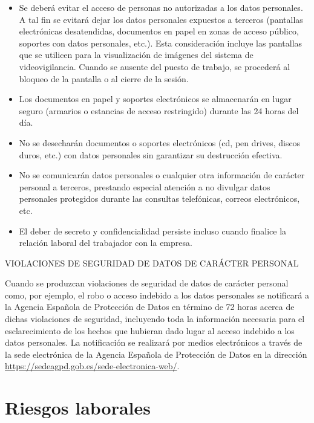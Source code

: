 \documentclass[11pt]{article}
\begin{document}
\begin{itemize}
\item Se deberá evitar el acceso de personas no autorizadas a los datos personales. A tal fin se evitará dejar los datos personales expuestos a terceros (pantallas electrónicas desatendidas, documentos en papel en zonas de acceso público, soportes con datos personales, etc.). Esta consideración incluye las pantallas que se utilicen para la visualización de imágenes del sistema de videovigilancia. Cuando se ausente del puesto de trabajo, se procederá al bloqueo de la pantalla o al cierre de la sesión.

\item Los documentos en papel y soportes electrónicos se almacenarán en lugar seguro (armarios o estancias de acceso restringido) durante las 24 horas del día.

\item No se desecharán documentos o soportes electrónicos (cd, pen drives, discos duros, etc.) con datos personales sin garantizar su destrucción efectiva.

\item No se comunicarán datos personales o cualquier otra información de carácter personal a terceros, prestando especial atención a no divulgar datos personales protegidos durante las consultas telefónicas, correos electrónicos, etc.

\item El deber de secreto y confidencialidad persiste incluso cuando finalice la relación laboral del trabajador con la empresa.
\end{itemize}

VIOLACIONES DE SEGURIDAD DE DATOS DE CARÁCTER PERSONAL

Cuando se produzcan violaciones de seguridad de datos de carácter personal como, por ejemplo, el robo o acceso indebido a los datos personales se notificará a la Agencia Española de Protección de Datos en término de 72 horas acerca de dichas violaciones de seguridad, incluyendo toda la información necesaria para el esclarecimiento de los hechos que hubieran dado lugar al acceso indebido a los datos personales. La notificación se realizará por medios electrónicos a través de la sede electrónica de la Agencia Española de Protección de Datos en la dirección \url{https://sedeagpd.gob.es/sede-electronica-web/}.

\section{Riesgos laborales}
\label{sec:orgd0ac22b}
\end{document}
